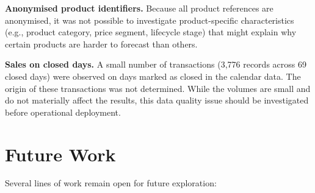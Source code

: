 \textbf{Anonymised product identifiers.} Because all product references are anonymised, it was not possible to investigate product-specific characteristics (e.g., product category, price segment, lifecycle stage) that might explain why certain products are harder to forecast than others.

\textbf{Sales on closed days.} A small number of transactions (3,776 records across 69 closed days) were observed on days marked as closed in the calendar data. The origin of these transactions was not determined. While the volumes are small and do not materially affect the results, this data quality issue should be investigated before operational deployment.

\section{Future Work}

Several lines of work remain open for future exploration:

